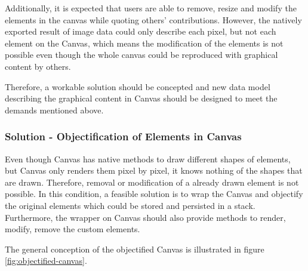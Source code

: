 Additionally, it is expected that users are able to remove, resize and modify the elements in the canvas while quoting others' contributions. However, the natively exported result of image data could only describe each pixel, but not each element on the Canvas, which means the modification of the elements is not possible even though the whole canvas could be reproduced with graphical content by others. 

Therefore, a workable solution should be concepted and new data model describing the graphical content in Canvas should be designed to meet the demands mentioned above.

\subsubsection{Solution - Objectification of Elements in Canvas}

Even though Canvas has native methods to draw different shapes of elements, but Canvas only renders them pixel by pixel, it knows nothing of the shapes that are drawn. Therefore, removal or modification of a already drawn element is not possible. In this condition, a feasible solution is to wrap the Canvas and objectify the original elements which could be stored and persisted in a stack. Furthermore, the wrapper on Canvas should also provide methods to render, modify, remove the custom elements. 

The general conception of the objectified Canvas is illustrated in figure \ref{fig:objectified-canvas}.

